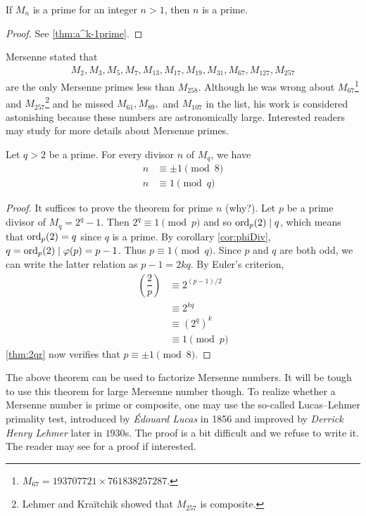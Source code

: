 \documentclass{subfiles}
\begin{document}
		\begin{proposition}
			If $M_n$ is a prime for an integer $n>1$, then $n$ is a prime.
		\end{proposition}

		\begin{proof}
			See \autoref{thm:a^k-1prime}.
		\end{proof}

	Mersenne stated that
		\begin{align*}
				M_{2}, M_{3}, M_{5}, M_{7}, M_{13},M_{17},M_{19},M_{31},M_{67},M_{127},M_{257}
		\end{align*}
	are the only Mersenne primes less than $M_{258}$. Although he was wrong about $M_{67}$\footnote{$M_{67}=193707721 \times 761838257287.$} and $M_{257}$\footnote{Lehmer and Kra\"{i}tchik showed that $M_{257}$ is composite.} and he missed $M_{61}, M_{89},$ and $M_{107}$ in the list, his work is considered astonishing because these numbers are astronomically large. Interested readers may study \textcite{ribenboim_1991} for more details about Mersenne primes.

		\begin{theorem}
				Let $q>2$ be a prime. For every divisor $n$ of $M_q$, we have
					\begin{align*}
						n &\equiv \pm 1 \pmod 8\\
						n &\equiv 1 \pmod q
					\end{align*}
		\end{theorem}

		\begin{proof}
			It suffices to prove the theorem for prime $n$ (why?). Let $p$ be a prime divisor of $M_q=2^q-1$. Then $2^q \equiv 1 \pmod p$ and so $\operatorname{ord}_p(2)\mid q$, which means that $\operatorname{ord}_p(2)=q$ since $q$ is a prime. By corollary \eqref{cor:phiDiv}, $q=\operatorname{ord}_p(2)\mid \varphi(p)=p-1$. Thus $p \equiv 1 \pmod q$. Since $p$ and $q$ are both odd, we can write the latter relation as $p-1=2kq$. By Euler's criterion,
				\begin{align*}
					\left(\dfrac{2}{p}\right) &\equiv 2^{(p-1)/2} \\
											  &\equiv 2^{kq}\\
											  &\equiv \left(2^q\right)^k\\
											  &\equiv 1 \pmod p
				\end{align*}
			\autoref{thm:2qr} now verifies that $p \equiv \pm 1 \pmod 8$.
		\end{proof}

	The above theorem can be used to factorize Mersenne numbers. It will be tough to use this theorem for large Mersenne number though. To realize whether a Mersenne number is prime or composite, one may use the so-called Lucas–Lehmer primality test, introduced by \textit{\'Edouard Lucas} in 1856 and improved by \textit{Derrick Henry Lehmer} later in $1930$s. The proof is a bit difficult and we refuse to write it. The reader may see \textcite{bruce_1993} for a proof if interested.
\end{document}
